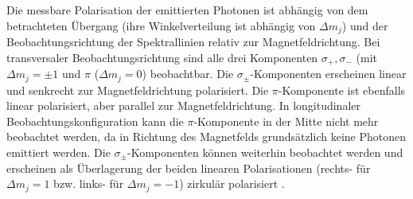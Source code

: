 Die messbare Polarisation der emittierten Photonen ist abhängig von dem betrachteten Übergang (ihre Winkelverteilung ist abhängig von $\Delta m_j$) und der Beobachtungsrichtung der Spektrallinien relativ zur Magnetfeldrichtung. Bei transversaler Beobachtungsrichtung sind alle drei Komponenten $\sigma_+, \sigma_-$ (mit $\Delta m_j=\pm 1$ und $\pi$ ($\Delta m_j =0$) beobachtbar. Die $\sigma_\pm$-Komponenten erscheinen linear und senkrecht zur Magnetfeldrichtung polarisiert. Die $\pi$-Komponente ist ebenfalls linear polarisiert, aber parallel zur Magnetfeldrichtung. In longitudinaler Beobachtungskonfiguration kann die $\pi$-Komponente in der Mitte nicht mehr beobachtet werden, da in Richtung des Magnetfelds grundsätzlich keine Photonen emittiert werden. Die $\sigma_\pm$-Komponenten können weiterhin beobachtet werden und erscheinen als Überlagerung der beiden linearen Polarisationen (rechts- für $\Delta m_j=1$ bzw. links- für $\Delta m_j=-1$) zirkulär polarisiert \cite[216-219]{HakenWolf2013}.
